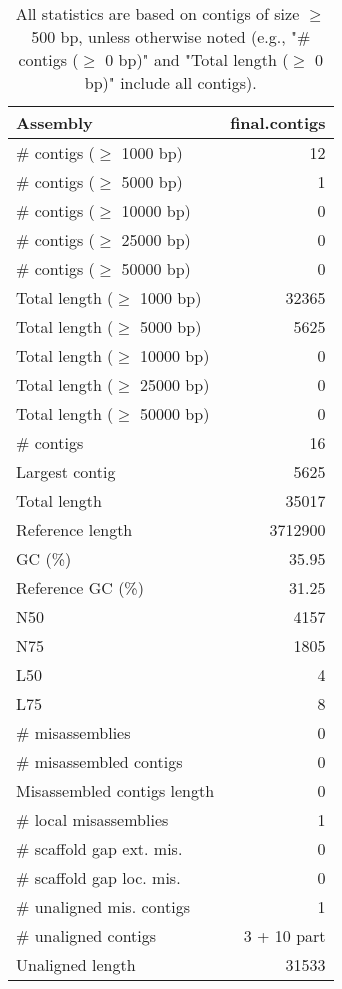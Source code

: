 \documentclass[12pt,a4paper]{article}
\begin{document}
\begin{table}[ht]
\begin{center}
\caption{All statistics are based on contigs of size $\geq$ 500 bp, unless otherwise noted (e.g., "\# contigs ($\geq$ 0 bp)" and "Total length ($\geq$ 0 bp)" include all contigs).}
\begin{tabular}{|l*{1}{|r}|}
\hline
Assembly & final.contigs \\ \hline
\# contigs ($\geq$ 1000 bp) & 12 \\ \hline
\# contigs ($\geq$ 5000 bp) & 1 \\ \hline
\# contigs ($\geq$ 10000 bp) & 0 \\ \hline
\# contigs ($\geq$ 25000 bp) & 0 \\ \hline
\# contigs ($\geq$ 50000 bp) & 0 \\ \hline
Total length ($\geq$ 1000 bp) & 32365 \\ \hline
Total length ($\geq$ 5000 bp) & 5625 \\ \hline
Total length ($\geq$ 10000 bp) & 0 \\ \hline
Total length ($\geq$ 25000 bp) & 0 \\ \hline
Total length ($\geq$ 50000 bp) & 0 \\ \hline
\# contigs & 16 \\ \hline
Largest contig & 5625 \\ \hline
Total length & 35017 \\ \hline
Reference length & 3712900 \\ \hline
GC (\%) & 35.95 \\ \hline
Reference GC (\%) & 31.25 \\ \hline
N50 & 4157 \\ \hline
N75 & 1805 \\ \hline
L50 & 4 \\ \hline
L75 & 8 \\ \hline
\# misassemblies & 0 \\ \hline
\# misassembled contigs & 0 \\ \hline
Misassembled contigs length & 0 \\ \hline
\# local misassemblies & 1 \\ \hline
\# scaffold gap ext. mis. & 0 \\ \hline
\# scaffold gap loc. mis. & 0 \\ \hline
\# unaligned mis. contigs & 1 \\ \hline
\# unaligned contigs & 3 + 10 part \\ \hline
Unaligned length & 31533 \\ \hline

\end{tabular}
\end{center}
\end{table}
\end{document}
